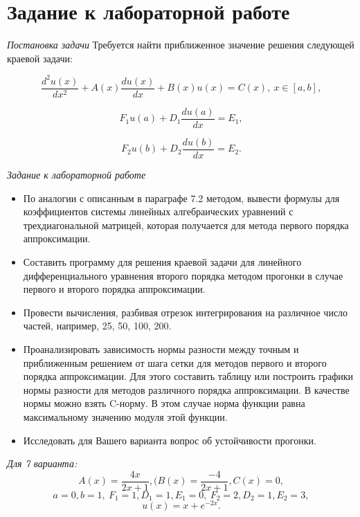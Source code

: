 \documentclass[a4paper,12pt]{article}
\begin{document}


\section{\normalsize{Задание к лабораторной работе}}
\begin{flushleft}
  \textit{Постановка задачи}\linebreak
  Требуется найти приближенное значение решения следующей краевой задачи:

  \begin{equation}\label{eq:pos_1}
    \frac{d^2u(x)}{dx^2} + A(x)\frac{du(x)}{dx} + B(x)u(x) = C(x),~x \in [a,b],
  \end{equation}

  \begin{equation}\label{eq:pos_2}
    F_1u(a) + D_1\frac{du(a)}{dx} = E_1,
  \end{equation}

  \begin{equation}\label{eq:pos_2}
    F_2u(b) + D_2\frac{du(b)}{dx} = E_2.
  \end{equation}

  \textit{Задание к лабораторной работе}\linebreak
  \begin{itemize}
    \item По аналогии с описанным в параграфе 7.2 методом, вывести формулы для коэффициентов системы линейных алгебраических уравнений с трехдиагональной матрицей, которая получается для метода первого порядка аппроксимации.
    \item Составить программу для решения краевой задачи для линейного дифференциального уравнения второго порядка методом прогонки в случае первого и второго порядка аппроксимации.
    \item Провести вычисления, разбивая отрезок интегрирования на различное число частей, например, 25, 50, 100, 200.
    \item Проанализировать зависимость нормы разности между точным и приближенным решением от шага сетки для методов первого и второго порядка аппроксимации. Для этого составить таблицу или построить графики нормы разности для методов различного порядка аппроксимации. В качестве нормы можно взять C-норму. В этом случае норма функции равна максимальному значению модуля этой функции.
    \item Исследовать для Вашего варианта вопрос об устойчивости прогонки.
  \end{itemize}

  \textit{Для 7 варианта:}\linebreak
  \begin{equation}\label{eq:params}
    A(x) = \frac{4x}{2x+1}, (B(x) = \frac{-4}{2x+1}, C(x) = 0,
  \end{equation}
  \begin{equation*}
    a = 0, b = 1,~F_1 = 1, D_1 = 1, E_1 = 0,~F_2 = 2, D_2 = 1, E_2 = 3,
  \end{equation*}
  \begin{equation*}
    u(x) = x + e^{-2x}.
  \end{equation*}
\end{flushleft}
\end{document}
